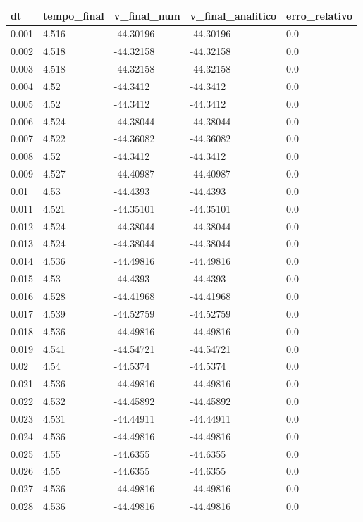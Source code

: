 \begin{tabular}{lllll}
\toprule
dt & tempo\_final & v\_final\_num & v\_final\_analitico & erro\_relativo \\
\midrule
0.001 & 4.516 & -44.30196 & -44.30196 & 0.0 \\
0.002 & 4.518 & -44.32158 & -44.32158 & 0.0 \\
0.003 & 4.518 & -44.32158 & -44.32158 & 0.0 \\
0.004 & 4.52 & -44.3412 & -44.3412 & 0.0 \\
0.005 & 4.52 & -44.3412 & -44.3412 & 0.0 \\
0.006 & 4.524 & -44.38044 & -44.38044 & 0.0 \\
0.007 & 4.522 & -44.36082 & -44.36082 & 0.0 \\
0.008 & 4.52 & -44.3412 & -44.3412 & 0.0 \\
0.009 & 4.527 & -44.40987 & -44.40987 & 0.0 \\
0.01 & 4.53 & -44.4393 & -44.4393 & 0.0 \\
0.011 & 4.521 & -44.35101 & -44.35101 & 0.0 \\
0.012 & 4.524 & -44.38044 & -44.38044 & 0.0 \\
0.013 & 4.524 & -44.38044 & -44.38044 & 0.0 \\
0.014 & 4.536 & -44.49816 & -44.49816 & 0.0 \\
0.015 & 4.53 & -44.4393 & -44.4393 & 0.0 \\
0.016 & 4.528 & -44.41968 & -44.41968 & 0.0 \\
0.017 & 4.539 & -44.52759 & -44.52759 & 0.0 \\
0.018 & 4.536 & -44.49816 & -44.49816 & 0.0 \\
0.019 & 4.541 & -44.54721 & -44.54721 & 0.0 \\
0.02 & 4.54 & -44.5374 & -44.5374 & 0.0 \\
0.021 & 4.536 & -44.49816 & -44.49816 & 0.0 \\
0.022 & 4.532 & -44.45892 & -44.45892 & 0.0 \\
0.023 & 4.531 & -44.44911 & -44.44911 & 0.0 \\
0.024 & 4.536 & -44.49816 & -44.49816 & 0.0 \\
0.025 & 4.55 & -44.6355 & -44.6355 & 0.0 \\
0.026 & 4.55 & -44.6355 & -44.6355 & 0.0 \\
0.027 & 4.536 & -44.49816 & -44.49816 & 0.0 \\
0.028 & 4.536 & -44.49816 & -44.49816 & 0.0 \\

\end{tabular}
